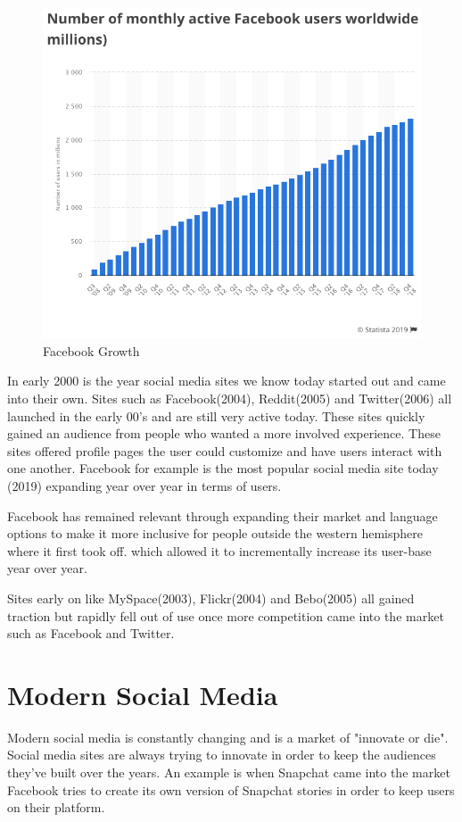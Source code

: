 \begin{figure}[!htb]
  \includegraphics[width=\linewidth]{img/facebook-growth.png}
  \caption{Facebook Growth}
  \label{fig:FacebookG}
\end{figure}

In early 2000 is the year social media sites we know today started out and came into their own. Sites such as Facebook(2004), Reddit(2005) and Twitter(2006) all launched in the early 00's and are still very active today. These sites quickly gained an audience from people who wanted a more involved experience. These sites offered profile pages the user could customize and have users interact with one another. Facebook for example is the most popular social media site today (2019) expanding year over year in terms of users. 

Facebook has remained relevant through expanding their market and language options to make it more inclusive for people outside the western hemisphere where it first took off. which allowed it to incrementally increase its user-base year over year.

Sites early on like MySpace(2003), Flickr(2004) and Bebo(2005) all gained traction but rapidly fell out of use once more competition came into the market such as Facebook and Twitter.

\section{Modern Social Media}
Modern social media is constantly changing and is a market of "innovate or die". Social media sites are always trying to innovate in order to keep the audiences they've built over the years. An example is when Snapchat came into the market Facebook tries to create its own version of Snapchat stories in order to keep users on their platform.

